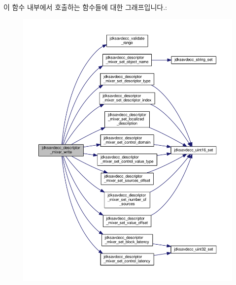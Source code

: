이 함수 내부에서 호출하는 함수들에 대한 그래프입니다.\+:
\nopagebreak
\begin{figure}[H]
\begin{center}
\leavevmode
\includegraphics[width=350pt]{group__descriptor__mixer_ga97d408af61853994b897460787b37473_cgraph}
\end{center}
\end{figure}


